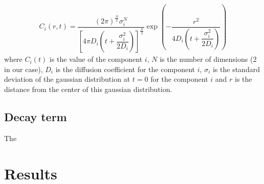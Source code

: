 \documentclass[a4paper]{article}
\begin{document}
\begin{align}
\label{eq:diffusion}
	C_i(r, t)= \dfrac{ \left( 2 \pi \right) ^\frac{N}{2} \sigma^N_i }{ \left[ 4 \pi D_i \left( t + \dfrac{\sigma^2_i}{2D_i} \right) \right]^\frac{N}{2} } \exp \left(- \dfrac{r^2}{4 D_i \left ( t+ \dfrac{\sigma^2_i}{2D_i} \right) } \right)
\end{align}
where $C_i(t)$ is the value of the component $i$, $N$ is the number of dimensions (2 in our case), $D_i$ is the diffusion coefficient for the component $i$, $\sigma_i$ is the standard deviation of the gaussian distribution at $t=0$ for the component $i$ and $r$ is the distance from the center of this gaussian distribution.


\subsection{Decay term}

The 

\section{Results}



\listoftables
\listoffigures
\end{document}
